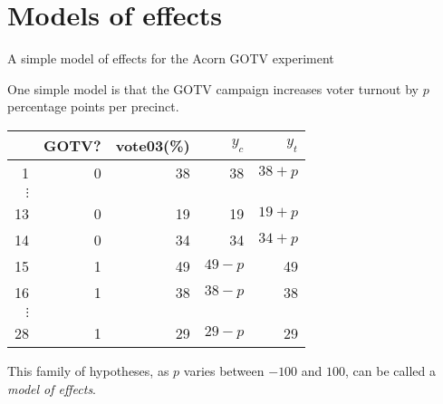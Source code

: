 \section{Models of effects}
\begin{frame}{A simple model of effects for the Acorn GOTV experiment}
  
One simple model is that the GOTV campaign increases voter turnout by $p$ percentage points per precinct.

\begin{center}
  \begin{tabular}{r|rr|rr}
  \hline
 & GOTV? & vote03(\%)& $y_c$ & $y_t$ \\
  \hline
1 & 0 & 38 & 38 & $38+p$\\
$\vdots$& & & & \\
13 & 0 & 19 & 19& $19+p$\\
14 & 0 & 34 & 34& $34+p$\\
15 & 1 & 49 & $49-p$& 49\\
16 & 1 & 38 & $38-p$& 38\\
$\vdots$& & & & \\
28 & 1 & 29 & $29-p$& 29\\
   \hline
\end{tabular}

\end{center}

This family of hypotheses, as $p$ varies between $-100$ and $100$, can be called a \textit{model of effects}.
\end{frame}

